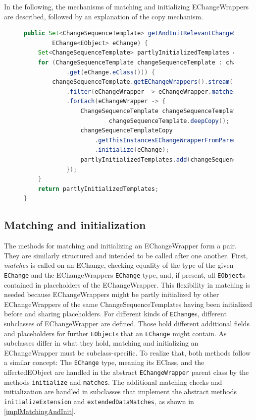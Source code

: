 In the following, the mechanisms of matching and initializing EChangeWrappers are described, followed by an explanation of the copy mechanism.

\begin{figure}[H]
\centering
\begin{lstlisting}[language=java, caption={Change Sequence Template Instantiation in \texttt{ChangeSequenceTemplateSet}}, captionpos=b, label=implChangeSequenceTemplateSetGetAndInit]
public Set<ChangeSequenceTemplate> getAndInitRelevantChangeSequenceTemplatesByEChange(
        EChange<EObject> eChange) {
    Set<ChangeSequenceTemplate> partlyInitializedTemplates = new HashSet<>();
    for (ChangeSequenceTemplate changeSequenceTemplate : changeSequenceTemplatesByEChangeType
            .get(eChange.eClass())) {
        changeSequenceTemplate.getEChangeWrappers().stream()
            .filter(eChangeWrapper -> eChangeWrapper.matches(eChange))
            .forEach(eChangeWrapper -> {
                ChangeSequenceTemplate changeSequenceTemplateCopy = 
                        changeSequenceTemplate.deepCopy();
                changeSequenceTemplateCopy
                    .getThisInstancesEChangeWrapperFromParent(eChangeWrapper)
                    .initialize(eChange);
                partlyInitializedTemplates.add(changeSequenceTemplateCopy);
            });
    }
    return partlyInitializedTemplates;
}
\end{lstlisting}
\end{figure}


\subsection{Matching and initialization}
\label{sec:Implementation:MatchingAndInit}
The methods for matching and initializing an EChangeWrapper form a pair. They are similarly structured and intended to be called after one another.
First, \emph{matches} is called on an EChange, checking equality of the type of the given \texttt{EChange} and the EChangeWrappers \texttt{EChange} type, and, if present, all \texttt{EObject}s contained in placeholders of the EChangeWrapper. This flexibility in matching is needed because EChangeWrappers might be partly initialized by other EChangeWrappers of the same ChangeSequenceTemplates having been initialized before and sharing placeholders.
For different kinds of \texttt{EChange}s, different subclasses of EChangeWrapper are defined. Those hold different additional fields and placeholders for further \texttt{EObject}s that an \texttt{EChange} might contain. As subclasses differ in what they hold, matching and initializing an EChangeWrapper must be subclass-specific.
To realize that, both methods follow a similar concept: The \texttt{EChange} type, meaning its EClass, and the affectedEObject are handled in the abstract \texttt{EChangeWrapper} parent class by the methods \texttt{initialize} and \texttt{matches}. The additional matching checks and initialization are handled in subclasses that implement the abstract methods \texttt{initializeExtension} and \texttt{extendedDataMatches}, as shown in \autoref{implMatchingAndInit}.

